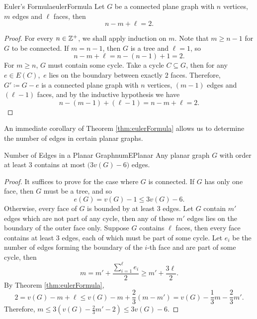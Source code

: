 \documentclass[math]{amznotes}
\theoremstyle{remark}
\newcommand{\0}{\mathbf{0}}
\newcommand{\1}{\mathbf{1}}
\begin{document}
\begin{thmbox}{Euler's Formula}{eulerFormula}
    Let $G$ be a connected plane graph with $n$ vertices, $m$ edges and $\ell$ faces, then 
    \begin{equation*}
        n - m + \ell = 2.
    \end{equation*}
    \tcblower
    \begin{proof}
        For every $n \in \mathbb{Z}^+$, we shall apply induction on $m$. Note that $m \geq n - 1$ for $G$ to be connected. If $m = n - 1$, then $G$ is a tree and $\ell = 1$, so 
        \begin{equation*}
            n - m + \ell = n - (n - 1) + 1 = 2.
        \end{equation*}
        For $m \geq n$, $G$ must contain some cycle. Take a cycle $C \subseteq G$, then for any $e \in E(C)$,~$e$ lies on the boundary between exactly $2$ faces. Therefore, $G' \coloneqq G - e$ is a connected plane graph with $n$ vertices, $(m - 1)$ edges and $(\ell - 1)$ faces, and by the inductive hypothesis we have 
        \begin{equation*}
            n - (m - 1) + (\ell - 1) = n - m + \ell = 2.
        \end{equation*}
    \end{proof}
\end{thmbox}
An immediate corollary of Theorem \ref{thm:eulerFormula} allows us to determine the number of edges in certain planar graphs.
\begin{corbox}{Number of Edges in a Planar Graph}{numEPlanar}
    Any planar graph $G$ with order at least $3$ contains at most $\bigl(3v(G) - 6\bigr)$ edges.
    \tcblower
    \begin{proof}
        It suffices to prove for the case where $G$ is connected. If $G$ has only one face, then $G$ must be a tree, and so 
        \begin{equation*}
            e(G) = v(G) - 1 \leq 3v(G) - 6.
        \end{equation*}
        Otherwise, every face of $G$ is bounded by at least $3$ edges. Let $G$ contain $m'$ edges which are not part of any cycle, then any of these $m'$ edges lies on the boundary of the outer face only. Suppose $G$ contains $\ell$ faces, then every face contains at least $3$ edges, each of which must be part of some cycle. Let $e_i$ be the number of edges forming the boundary of the $i$-th face and are part of some cycle, then 
        \begin{equation*}
            m = m' + \frac{\sum_{i = 1}^{\ell}e_i}{2} \geq m' + \frac{3\ell}{2}.
        \end{equation*}
        By Theorem \ref{thm:eulerFormula}, 
        \begin{equation*}
            2 = v(G) - m + \ell \leq v(G) - m + \frac{2}{3}\left(m - m'\right) = v(G) - \frac{1}{3}m - \frac{2}{3}m'.
        \end{equation*}
        Therefore, $m \leq 3\left(v(G) - \frac{2}{3}m' - 2\right) \leq 3v(G) - 6$.
    \end{proof}
\end{corbox}
\end{document}
